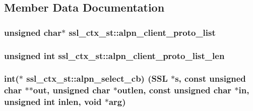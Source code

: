 \subsection{Member Data Documentation}
\subsubsection[{\texorpdfstring{alpn\+\_\+client\+\_\+proto\+\_\+list}{alpn_client_proto_list}}]{\setlength{\rightskip}{0pt plus 5cm}unsigned char$\ast$ ssl\+\_\+ctx\+\_\+st\+::alpn\+\_\+client\+\_\+proto\+\_\+list}\hypertarget{structssl__ctx__st_a28a0a2ba5425026ecc984941a26b6934}{}\label{structssl__ctx__st_a28a0a2ba5425026ecc984941a26b6934}
\subsubsection[{\texorpdfstring{alpn\+\_\+client\+\_\+proto\+\_\+list\+\_\+len}{alpn_client_proto_list_len}}]{\setlength{\rightskip}{0pt plus 5cm}unsigned int ssl\+\_\+ctx\+\_\+st\+::alpn\+\_\+client\+\_\+proto\+\_\+list\+\_\+len}\hypertarget{structssl__ctx__st_aff08e359750548f5b49a49ce125a8e39}{}\label{structssl__ctx__st_aff08e359750548f5b49a49ce125a8e39}
\subsubsection[{\texorpdfstring{alpn\+\_\+select\+\_\+cb}{alpn_select_cb}}]{\setlength{\rightskip}{0pt plus 5cm}int($\ast$ ssl\+\_\+ctx\+\_\+st\+::alpn\+\_\+select\+\_\+cb) ({\bf S\+SL} $\ast$s, const unsigned char $\ast$$\ast$out, unsigned char $\ast$outlen, const unsigned char $\ast$in, unsigned int inlen, void $\ast$arg)}\hypertarget{structssl__ctx__st_a0d08de0a93374586a4f818171e49eff6}{}\label{structssl__ctx__st_a0d08de0a93374586a4f818171e49eff6}
